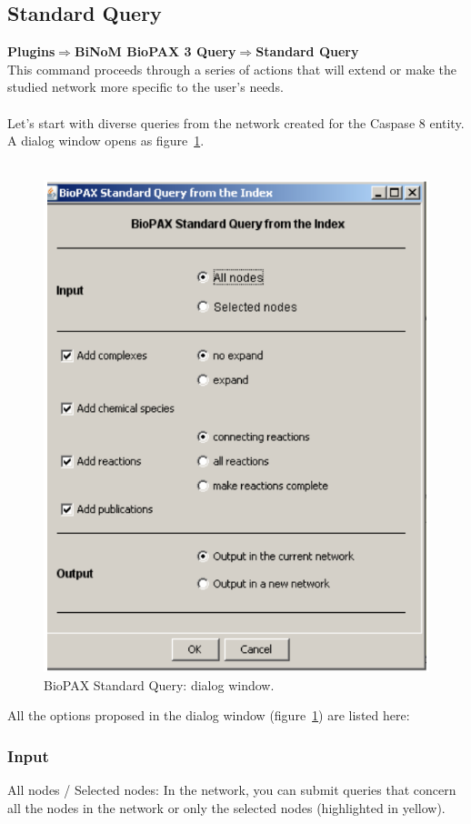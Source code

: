 \subsection{Standard Query}
\textbf{Plugins$\Rightarrow$BiNoM BioPAX 3 Query$\Rightarrow$Standard Query}\\
This command proceeds through a series of actions that will extend or make the studied network more specific to the user’s needs.\\\\
Let’s start with diverse queries from the network created for the Caspase 8 entity. A dialog window opens as figure~\ref{Standard_Query_Dialog}.\\\\
\begin{figure}[h]
\centering
\includegraphics[width=12 cm]{graphics/Standard_Query_Dialog}
\caption{BioPAX Standard Query: dialog window.}
\label{Standard_Query_Dialog}
\end{figure}
All the options proposed in the dialog window (figure~\ref{Standard_Query_Dialog}) are listed here:
\subsubsection{Input}
All nodes / Selected nodes: In the network, you can submit queries that concern all the nodes in the network or only the selected nodes (highlighted in yellow). 
